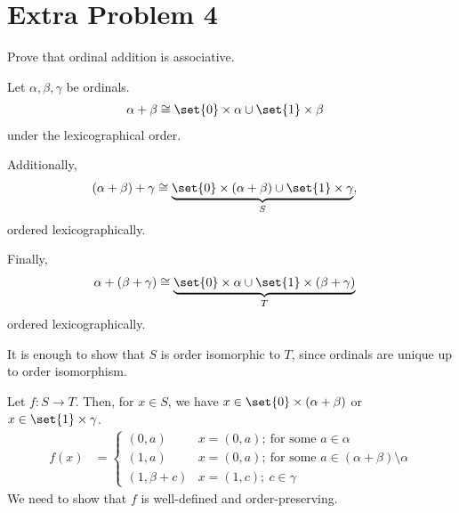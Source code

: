 \documentclass[10pt]{mypackage}
\begin{document}
\section{Extra Problem 4}%
\begin{problem}
  Prove that ordinal addition is associative.
\end{problem}
\begin{solution}
  Let $\alpha,\beta,\gamma$ be ordinals.
  \begin{align*}
    \alpha + \beta &\cong \set{0}\times \alpha \cup \set{1}\times \beta
  \end{align*}
  under the lexicographical order.\newline

  Additionally,
  \begin{align*}
    \left(\alpha + \beta\right) + \gamma &\cong \underbrace{\set{0}\times \left(\alpha + \beta\right) \cup \set{1}\times \gamma}_{S},
  \end{align*}
  ordered lexicographically.\newline

  Finally,
  \begin{align*}
    \alpha + \left(\beta + \gamma\right) &\cong \underbrace{\set{0}\times \alpha \cup \set{1}\times \left(\beta + \gamma\right)}_{T}
  \end{align*}
  ordered lexicographically.\newline

  It is enough to show that $S$ is order isomorphic to $T$, since ordinals are unique up to order isomorphism.\newline

  Let $f: S\rightarrow T$. Then, for $x\in S$, we have $x\in \set{0}\times \left(\alpha + \beta\right)$ or $x\in \set{1}\times \gamma$.
  \begin{align*}
    f(x) &= \begin{cases}
      (0,a) & x = (0,a);~\text{for some }a\in \alpha\\
      (1,a) & x = (0,a);~\text{for some }a\in \left(\alpha + \beta\right)\setminus \alpha\\
      \left(1,\beta + c\right) & x = (1,c);~c\in \gamma
    \end{cases}
  \end{align*}
  We need to show that $f$ is well-defined and order-preserving.
\end{solution}
\end{document}
